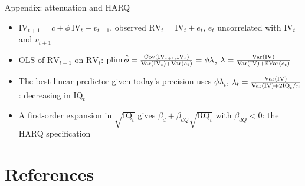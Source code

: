 \begin{frame}{Appendix: attenuation and HARQ}
\hypertarget{atsapp3}{}
\itemsize{\small}
\begin{itemize}
    \item $\mathrm{IV}_{t+1} = c + \phi\,\mathrm{IV}_t + v_{t+1}$, observed $\mathrm{RV}_t = \mathrm{IV}_t + e_t$, $e_t$ uncorrelated with $\mathrm{IV}_t$ and $v_{t+1}$
    \item OLS of $\mathrm{RV}_{t+1}$ on $\mathrm{RV}_t$: $\mathrm{plim}\,\hat\phi = \frac{\text{Cov}(\mathrm{IV}_{t+1}, \mathrm{IV}_t)}{\text{Var}(\mathrm{IV}_t) + \text{Var}(e_t)} = \phi\lambda$, $\lambda = \frac{\text{Var}(\mathrm{IV})}{\text{Var}(\mathrm{IV}) + \mathbb{E}\text{Var}(e_t)}$
    \item The best linear predictor given today's precision uses $\phi\lambda_t$, $\lambda_t = \frac{\text{Var}(\mathrm{IV})}{\text{Var}(\mathrm{IV}) + 2\mathrm{IQ}_t/n}$: decreasing in $\mathrm{IQ}_t$
    \item A first-order expansion in $\sqrt{\mathrm{IQ}_t}$ gives $\beta_d + \beta_{dQ}\sqrt{\mathrm{RQ}_t}$ with $\beta_{dQ} < 0$: the HARQ specification 
\end{itemize}
\end{frame}


\section{References}

